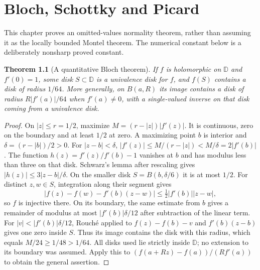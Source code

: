 \documentclass[11pt,a4paper,openany]{book}
\newtheorem{theorem}{Theorem}[chapter]
\theoremstyle{definition}
\theoremstyle{remark}\newtheorem{remark}[theorem]{Remark}
\newcommand{\D}{\mathbb D}\newcommand{\Chat}{\widehat{\mathbb C}}
\newcommand{\family}[1]{}
\begin{document}

\chapter{Bloch, Schottky and Picard}\label{ch:d12-23}

This chapter proves an omitted-values normality theorem, rather than
assuming it as the locally bounded Montel theorem. The numerical constant
below is a deliberately nonsharp proved constant.

\begin{theorem}[A quantitative Bloch theorem]\label{d12:23-01}\family{D12.23.01}
If $f$ is holomorphic on $\D$ and $f'(0)=1$, some disk $S\subset\D$
is a univalence disk for $f$, and $f(S)$ contains a disk of radius
$1/64$. More generally, on $B(a,R)$ its image contains a disk of
radius $R|f'(a)|/64$ when $f'(a)\ne0$, with a single-valued inverse
on that disk coming from a univalence disk.
\end{theorem}
\begin{proof}
On $|z|\le r=1/2$, maximize
$M=(r-|z|)|f'(z)|$. It is continuous, zero on the boundary and at
least $1/2$ at zero. A maximizing point $b$ is interior and
$\delta=(r-|b|)/2>0$. For $|z-b|<\delta$,
$|f'(z)|\le M/(r-|z|)<M/\delta=2|f'(b)|$.
The function $h(z)=f'(z)/f'(b)-1$ vanishes at $b$ and has modulus
less than three on that disk. Schwarz's lemma after rescaling gives
$|h(z)|\le3|z-b|/\delta$. On the smaller disk $S=B(b,\delta/6)$
it is at most $1/2$. For distinct $z,w\in S$, integration along
their segment gives
\[
 |f(z)-f(w)-f'(b)(z-w)|\le\tfrac12|f'(b)||z-w|,
\]
so $f$ is injective there. On its boundary, the same estimate from
$b$ gives a remainder of modulus at most
$|f'(b)|\delta/12$ after subtraction of the linear term.
For $|v|<|f'(b)|\delta/12$, Rouch\'e applied to
$f(z)-f(b)-v$ and $f'(b)(z-b)$ gives one zero inside $S$.
Thus its image contains the disk with this radius, which equals
$M/24\ge1/48>1/64$. All disks used lie strictly inside $\D$;
no extension to its boundary was assumed. Apply this to
$(f(a+Rz)-f(a))/(Rf'(a))$ to obtain the general assertion.
\end{proof}
\end{document}
